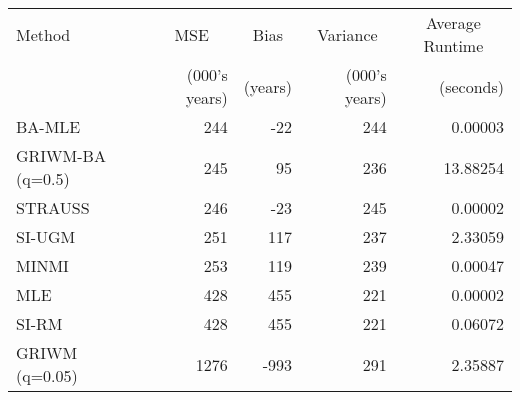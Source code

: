 
\begin{tabular}{lrrrr}
\toprule
\multicolumn{1}{l}{Method} & \multicolumn{1}{c}{MSE} & \multicolumn{1}{c}{Bias} & \multicolumn{1}{c}{Variance} & \multicolumn{1}{c}{Average Runtime} \\
 & (000's years) & (years) & (000's years) & (seconds)\\
\midrule
BA-MLE & 244 & -22 & 244 & 0.00003\\
GRIWM-BA (q=0.5) & 245 & 95 & 236 & 13.88254\\
STRAUSS & 246 & -23 & 245 & 0.00002\\
SI-UGM & 251 & 117 & 237 & 2.33059\\
MINMI & 253 & 119 & 239 & 0.00047\\
\addlinespace
MLE & 428 & 455 & 221 & 0.00002\\
SI-RM & 428 & 455 & 221 & 0.06072\\
GRIWM (q=0.05) & 1276 & -993 & 291 & 2.35887\\
\bottomrule
\end{tabular}
